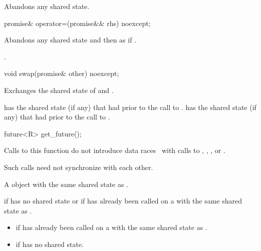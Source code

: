 \begin{itemdescr}
\pnum
\effects
Abandons any shared state.
\end{itemdescr}

%
\begin{itemdecl}
promise& operator=(promise&& rhs) noexcept;
\end{itemdecl}

\begin{itemdescr}
\pnum
\effects
Abandons any shared state and then as if
.

\pnum
\returns
{}.
\end{itemdescr}

%
\begin{itemdecl}
void swap(promise& other) noexcept;
\end{itemdecl}

\begin{itemdescr}
\pnum
\effects
Exchanges the shared state of  and .

\pnum
\ensures
{} has the shared state (if any) that  had
prior to the call to .  has the shared state (if any) that
 had prior to the call to .
\end{itemdescr}

%
\begin{itemdecl}
future<R> get_future();
\end{itemdecl}

\begin{itemdescr}
\pnum
\sync
Calls to this function do not introduce
data races~ with calls to
,
,
, or
.
\begin{note}
Such calls need not synchronize with each other.
\end{note}

\pnum
\returns
A  object with the same shared state as
.

\pnum
\throws
{} if  has no shared state or if
 has already been called on a  with the same
shared state as .

\pnum
\errors
\begin{itemize}
\item {} if  has already been called on
a  with the same shared state as .

\item {} if  has no shared state.
\end{itemize}
\end{itemdescr}

